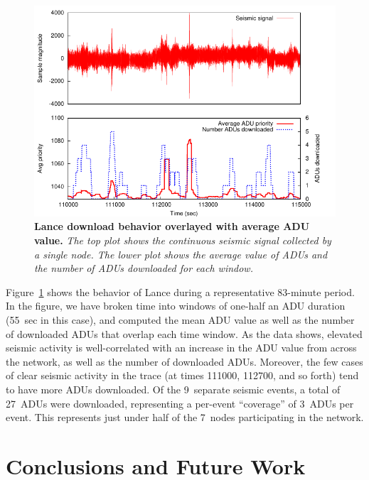 \documentclass[lettersize]{sig-alternate-konrad}
\begin{document}
\begin{figure}[t]
\begin{center}
\includegraphics[width=1.0\hsize]{./figs/deploy/deploydownloads/everything.pdf}
\end{center}
\caption{\small {\bf Lance download behavior overlayed with average
ADU value.} {\em The top plot shows the continuous seismic signal
collected by a single node. The lower plot shows the average value
of ADUs and the number of ADUs downloaded for each window.}}
\label{fig-downloads-cont}
\end{figure}

Figure~\ref{fig-downloads-cont} shows the behavior of Lance during a
representative 83-minute period. In the figure, we have broken time
into windows of one-half an ADU duration (55~sec in this case), and
computed the mean ADU value as well as the number of downloaded
ADUs that overlap each time window. As the data shows, elevated seismic
activity is well-correlated with an increase in the ADU value
from across the network, as well as the number of downloaded ADUs.
Moreover, the few cases of clear seismic activity in the trace 
(at times 111000, 112700, and so forth) tend to have more ADUs
downloaded. Of the 9~separate seismic events, a total of 27~ADUs were
downloaded, representing a per-event ``coverage'' of 3~ADUs per event.
This represents just under half of the 7~nodes participating in the network.

\section{Conclusions and Future Work}
\label{sec-conclusions}
\label{sec-conclusion}
\label{sec-future}
\label{sec-futurework}
\end{document}
